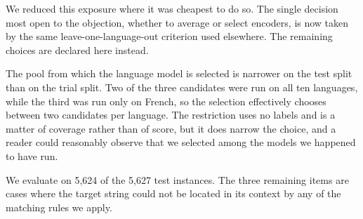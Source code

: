 We reduced this exposure where it was cheapest to do so. The single
decision most open to the objection, whether to average or select
encoders, is now taken by the same leave-one-language-out criterion
used elsewhere. The remaining choices are declared here instead.



The pool from which the language model is selected is narrower on the
test split than on the trial split. Two of the three candidates were
run on all ten languages, while the third was run only on French, so
the selection effectively chooses between two candidates per language.
The restriction uses no labels and is a matter of coverage rather than
of score, but it does narrow the choice, and a reader could reasonably
observe that we selected among the models we happened to have run.



We evaluate on 5{,}624 of the 5{,}627 test instances. The three
remaining items are cases where the target string could not be located
in its context by any of the matching rules we apply.



